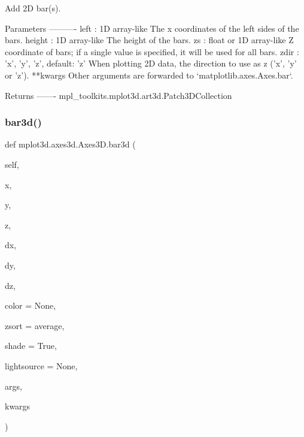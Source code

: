 \begin{DoxyVerb}Add 2D bar(s).

Parameters
----------
left : 1D array-like
    The x coordinates of the left sides of the bars.
height : 1D array-like
    The height of the bars.
zs : float or 1D array-like
    Z coordinate of bars; if a single value is specified, it will be
    used for all bars.
zdir : {'x', 'y', 'z'}, default: 'z'
    When plotting 2D data, the direction to use as z ('x', 'y' or 'z').
**kwargs
    Other arguments are forwarded to `matplotlib.axes.Axes.bar`.

Returns
-------
mpl_toolkits.mplot3d.art3d.Patch3DCollection
\end{DoxyVerb}
 \mbox{\label{classmplot3d_1_1axes3d_1_1Axes3D_af64225d8a9aeca2c9b5acf4953e402c8}} 
\subsubsection{\texorpdfstring{bar3d()}{bar3d()}}
{\footnotesize\ttfamily def mplot3d.\+axes3d.\+Axes3\+D.\+bar3d (\begin{DoxyParamCaption}\item[{}]{self,  }\item[{}]{x,  }\item[{}]{y,  }\item[{}]{z,  }\item[{}]{dx,  }\item[{}]{dy,  }\item[{}]{dz,  }\item[{}]{color = {\ttfamily None},  }\item[{}]{zsort = {\ttfamily \textquotesingle{}average\textquotesingle{}},  }\item[{}]{shade = {\ttfamily True},  }\item[{}]{lightsource = {\ttfamily None},  }\item[{}]{args,  }\item[{}]{kwargs }\end{DoxyParamCaption})}

